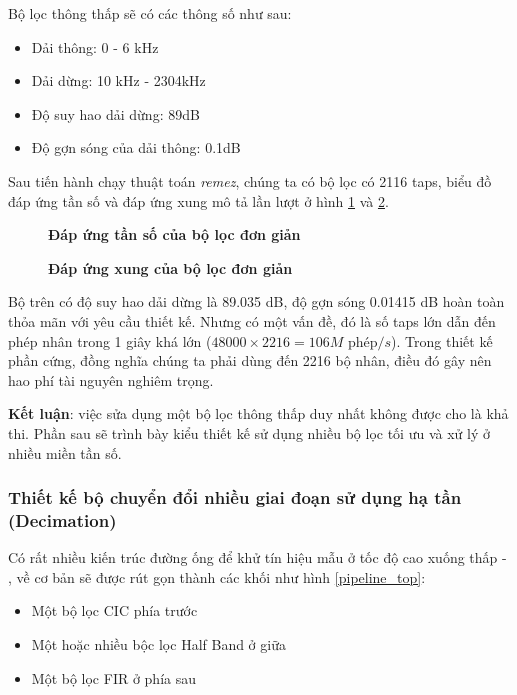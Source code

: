 Bộ lọc thông thấp sẽ có các thông số như sau: 
\begin{itemize}
    \item Dải thông: 0 - 6 kHz
    \item Dải dừng: 10 kHz - 2304kHz
    \item Độ suy hao dải dừng: 89dB
    \item Độ gợn sóng của dải thông: 0.1dB
\end{itemize}

Sau tiến hành chạy thuật toán \textit{remez}, chúng ta có bộ lọc có 2116 taps,  biểu đồ đáp ứng tần số và đáp ứng xung mô tả lần lượt ở hình \ref{filter_the_damn_thing} và \ref{filter_the_damn_thing_impulse}.
\begin{figure}[H]
    \centering
    
    \caption[Đáp ứng tần số của bộ lọc đơn giản]{\bfseries \fontsize{12pt}{0pt}\selectfont Đáp ứng tần số của bộ lọc đơn giản}
    \label{filter_the_damn_thing}
\end{figure}
\begin{figure}[H]
    \centering
    
    \caption[Đáp ứng xung của bộ lọc đơn giản]{\bfseries \fontsize{12pt}{0pt}\selectfont Đáp ứng xung của bộ lọc đơn giản}
    \label{filter_the_damn_thing_impulse}
\end{figure}

Bộ trên có độ suy hao dải dừng là 89.035 dB, độ gợn sóng 0.01415 dB hoàn toàn thỏa mãn với yêu cầu thiết kế. Nhưng có một vấn đề, đó là số taps lớn dẫn đến phép nhân trong 1 giây khá lớn ($48000 \times 2216 = 106M \text{ phép}/s$). Trong thiết kế phần cứng, đồng nghĩa chúng ta phải dùng đến 2216 bộ nhân, điều đó gây nên hao phí tài nguyên nghiêm trọng.

\textbf{Kết luận}: việc sửa dụng một bộ lọc thông thấp duy nhất không được cho là khả thi. Phần sau sẽ trình bày kiểu thiết kế sử dụng nhiều bộ lọc tối ưu và xử lý ở nhiều miền tần số.

\subsubsection{Thiết kế bộ chuyển đổi nhiều giai đoạn sử dụng hạ tần (Decimation)}
Có rất nhiều kiến trúc đường ống để khử tín hiệu mẫu ở tốc độ cao xuống thấp \cite{pipelie1} - \cite{pipelie2}, về cơ bản sẽ được rút gọn thành các khối như hình \ref{pipeline_top}:
\begin{itemize}
    \item Một bộ lọc CIC phía trước
    \item Một hoặc nhiều bộc lọc Half Band ở giữa
    \item Một bộ lọc FIR ở phía sau
\end{itemize}

